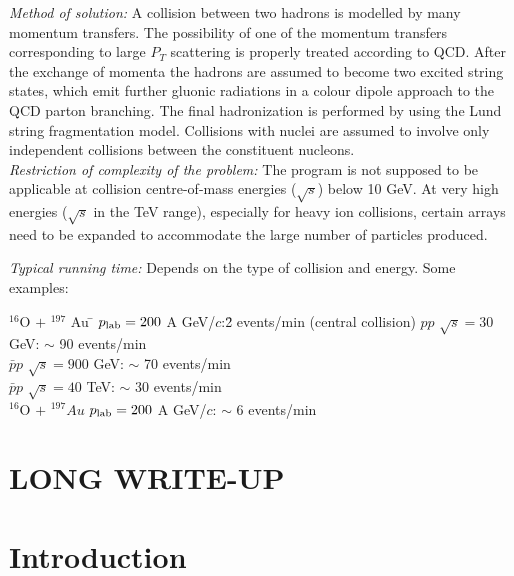 {\it Method of solution:} 
 A collision between two hadrons is modelled by many momentum transfers.
 The possibility of one of the momentum transfers corresponding to large $P_T$
 scattering is properly treated according to QCD.  
 After the exchange of momenta the
 hadrons are assumed to become two excited string states, which emit
 further gluonic radiations in a colour dipole approach to the QCD
 parton branching.  The final hadronization is performed by using the Lund 
 string fragmentation model.  Collisions with nuclei are assumed to
 involve only independent collisions between the constituent nucleons. \\ 

{\it Restriction of complexity of the problem:}
 The program is not supposed to be applicable at collision 
 centre-of-mass energies ($\sqrt{s}$) below
 10 GeV.  At very high energies ($\sqrt{s}$ in the TeV range), especially
 for heavy ion collisions, certain arrays need to be expanded to
 accommodate the large number of particles produced.   

{\it Typical running time:}
 Depends on the type of collision and energy.  Some examples:
 \begin{tabbing}
 $^{16}$O $+$ $^{197}$ Au \qquad \= $p_{\rm lab} = 200$ A GeV/$c$:\qquad \=
 2 events/min (central collision)      \kill
 $pp$ \> $\sqrt{s}=30$ GeV: \> $\sim$ 90 events/min \\
 $\bar pp$ \> $\sqrt{s}=900$ GeV: \> $\sim$ 70 events/min \\
 $\bar pp$ \> $\sqrt{s}=40$ TeV: \> $\sim$ 30 events/min \\
 $^{16}$O $+$ $^{197}Au$ \> $p_{\rm lab} = 200$ A GeV/$c$: \> 
 $\sim$ 6 events/min     
 \end{tabbing}

\vspace{0.3in}


\normalsize

\newpage

\section*{LONG WRITE-UP}

\section{Introduction}

